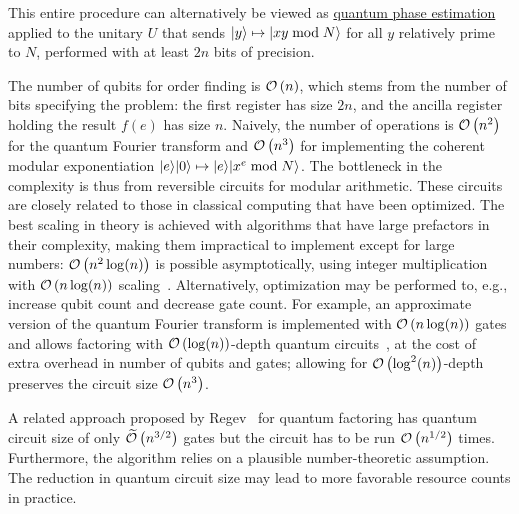 \begin{refsection}
This entire procedure can alternatively be viewed as \hyperref[prim:QPE]{quantum phase estimation} applied to the unitary $U$ that sends $\lvert y\rangle\mapsto \lvert xy \bmod N\rangle$ for all $y$ relatively prime to $N$, performed with at least $2n$ bits of precision. 

The number of qubits for order finding is $\mathcal{O}\left( n \right)$, which stems from the number of bits specifying the problem: the first register has size $2n$, and the ancilla register holding the result $f(e)$ has size $n$.  Naively, the number of operations is $\mathcal{O}\left( n^2 \right)$ for the quantum Fourier transform and $\mathcal{O}\left( n^3 \right)$ for implementing the coherent modular exponentiation $\lvert e\rangle\lvert0\rangle \mapsto \lvert e\rangle\lvert x^e \bmod N\rangle$. The bottleneck in the complexity is thus from reversible circuits for modular arithmetic. These circuits are closely related to those in classical computing that have been optimized. The best scaling in theory is achieved with algorithms that have large prefactors in their complexity, making them impractical to implement except for large numbers: $\mathcal{O}\left( n^2\log(n) \right)$ is possible asymptotically, using integer multiplication with $\mathcal{O}\left( n\log(n) \right)$ scaling~\cite{harvey2021IntegerMultiplication}. Alternatively, optimization may be performed to, e.g., increase qubit count and decrease gate count. For example, an approximate version of the quantum Fourier transform is implemented with $\mathcal{O}\left( n\log(n) \right)$ gates and allows factoring with $\mathcal{O}\left( \log (n) \right)$-depth quantum circuits~\cite{cleve2000FastQFT}, at the cost of extra overhead in number of qubits and gates; allowing for $\mathcal{O}\left( \log^2 (n) \right)$-depth preserves the circuit size $\mathcal{O}\left( n^3 \right)$.

A related approach proposed by Regev~\cite{regev2023efficient} for quantum factoring has quantum circuit size of only $\widetilde{\mathcal{O}}\left( n^{3/2} \right)$ gates but the circuit has to be run $\mathcal{O}\left( n^{1/2} \right)$ times. Furthermore, the algorithm relies on a plausible number-theoretic assumption. The reduction in quantum circuit size may lead to more favorable resource counts in practice.


\end{refsection}

